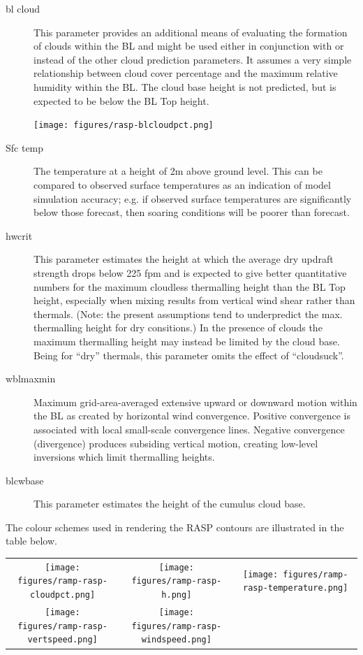 \begin{description}
\item[bl cloud]  
This parameter provides an additional means of evaluating the
formation of clouds within the BL and might be used either in
conjunction with or instead of the other cloud prediction parameters.
It assumes a very simple relationship between cloud cover percentage
and the maximum relative humidity within the BL.  The cloud base
height is not predicted, but is expected to be below the BL Top
height.

\begin{center}
\texttt{[image: figures/rasp-blcloudpct.png]}
\end{center}

\item[Sfc temp] 
The temperature at a height of 2m above ground level.  This can be
compared to observed surface temperatures as an indication of model
simulation accuracy; e.g. if observed surface temperatures are
significantly below those forecast, then soaring conditions will be
poorer than forecast.
\item[hwcrit]  
This parameter estimates the height at which the average dry updraft
strength drops below 225 fpm and is expected to give better
quantitative numbers for the maximum cloudless thermalling height than
the BL Top height, especially when mixing results from vertical wind
shear rather than thermals.  (Note: the present assumptions tend to
underpredict the max. thermalling height for dry consitions.) In the
presence of clouds the maximum thermalling height may instead be
limited by the cloud base.  Being for ``dry'' thermals, this parameter
omits the effect of ``cloudsuck''.
\item[wblmaxmin]  
Maximum grid-area-averaged extensive upward or downward motion within
the BL as created by horizontal wind convergence. Positive convergence
is associated with local small-scale convergence lines.  Negative
convergence (divergence) produces subsiding vertical motion, creating
low-level inversions which limit thermalling heights.
\item[blcwbase] This parameter estimates the height of the cumulus cloud
base.
\end{description}

\begin{maxipage}
The colour schemes used in rendering the RASP contours are illustrated
in the table below.

\begin{longtable}{c c c}
\texttt{[image: figures/ramp-rasp-cloudpct.png]}&

\texttt{[image: figures/ramp-rasp-h.png]}&

\texttt{[image: figures/ramp-rasp-temperature.png]}\\

\texttt{[image: figures/ramp-rasp-vertspeed.png]}&
\texttt{[image: figures/ramp-rasp-windspeed.png]}& \\

\end{longtable}
\end{maxipage}

